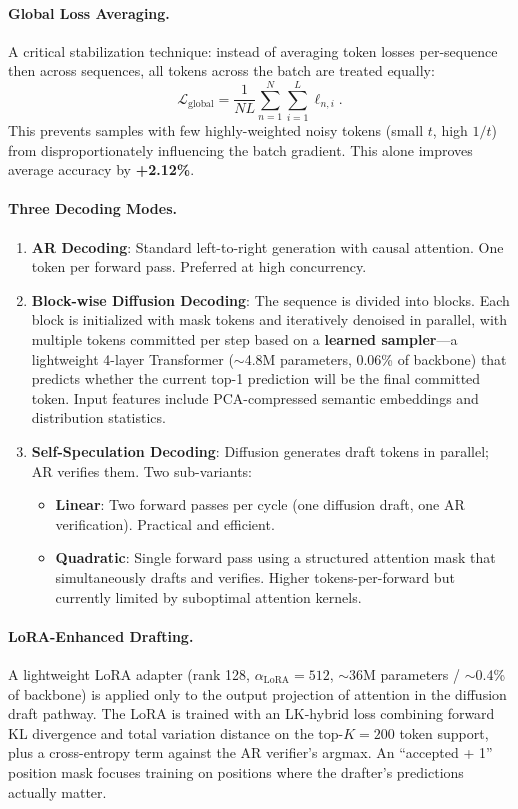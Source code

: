 \documentclass[11pt,a4paper]{article}
\begin{document}
\paragraph{Global Loss Averaging.} A critical stabilization technique: instead of averaging token losses per-sequence then across sequences, all tokens across the batch are treated equally:
\[
\mathcal{L}_{\mathrm{global}} = \frac{1}{NL} \sum_{n=1}^{N} \sum_{i=1}^{L} \ell_{n,i}.
\]
This prevents samples with few highly-weighted noisy tokens (small $t$, high $1/t$) from disproportionately influencing the batch gradient. This alone improves average accuracy by \textbf{+2.12\%}.

\paragraph{Three Decoding Modes.}

\begin{enumerate}
\item \textbf{AR Decoding}: Standard left-to-right generation with causal attention. One token per forward pass. Preferred at high concurrency.

\item \textbf{Block-wise Diffusion Decoding}: The sequence is divided into blocks. Each block is initialized with mask tokens and iteratively denoised in parallel, with multiple tokens committed per step based on a \textbf{learned sampler}---a lightweight 4-layer Transformer ($\sim$4.8M parameters, 0.06\% of backbone) that predicts whether the current top-1 prediction will be the final committed token. Input features include PCA-compressed semantic embeddings and distribution statistics.

\item \textbf{Self-Speculation Decoding}: Diffusion generates draft tokens in parallel; AR verifies them. Two sub-variants:
\begin{itemize}
\item \textbf{Linear}: Two forward passes per cycle (one diffusion draft, one AR verification). Practical and efficient.
\item \textbf{Quadratic}: Single forward pass using a structured attention mask that simultaneously drafts and verifies. Higher tokens-per-forward but currently limited by suboptimal attention kernels.
\end{itemize}
\end{enumerate}

\paragraph{LoRA-Enhanced Drafting.} A lightweight LoRA adapter (rank 128, $\alpha_{\mathrm{LoRA}} = 512$, $\sim$36M parameters / $\sim$0.4\% of backbone) is applied only to the output projection of attention in the diffusion draft pathway. The LoRA is trained with an LK-hybrid loss combining forward KL divergence and total variation distance on the top-$K = 200$ token support, plus a cross-entropy term against the AR verifier's argmax. An ``accepted + 1'' position mask focuses training on positions where the drafter's predictions actually matter.
\end{document}
